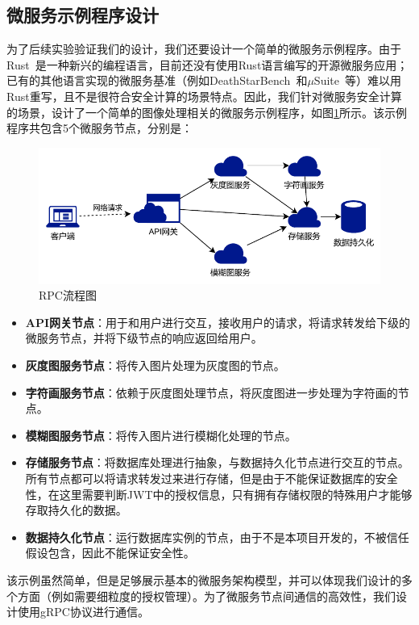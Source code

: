 \subsection{微服务示例程序设计}\label{subsec:ms-example}

为了后续实验验证我们的设计，我们还要设计一个简单的微服务示例程序。由于Rust~\cite{rust-lang}是一种新兴的编程语言，目前还没有使用Rust语言编写的开源微服务应用；已有的其他语言实现的微服务基准（例如DeathStarBench~\cite{gan2019open}和$\mu$Suite~\cite{sriraman2018mu}等）难以用Rust重写，且不是很符合安全计算的场景特点。因此，我们针对微服务安全计算的场景，设计了一个简单的图像处理相关的微服务示例程序，如图\ref{fig:ms-demo}所示。该示例程序共包含5个微服务节点，分别是：

\begin{figure}[!ht]
    \centering
    \includegraphics[width=.6\textwidth]{figures/msdemo.pdf}
    \caption{RPC流程图}
    \label{fig:ms-demo}
\end{figure}

\begin{itemize}
    \item \textbf{API网关节点}：用于和用户进行交互，接收用户的请求，将请求转发给下级的微服务节点，并将下级节点的响应返回给用户。
    \item \textbf{灰度图服务节点}：将传入图片处理为灰度图的节点。
    \item \textbf{字符画服务节点}：依赖于灰度图处理节点，将灰度图进一步处理为字符画的节点。
    \item \textbf{模糊图服务节点}：将传入图片进行模糊化处理的节点。
    \item \textbf{存储服务节点}：将数据库处理进行抽象，与数据持久化节点进行交互的节点。所有节点都可以将请求转发过来进行存储，但是由于不能保证数据库的安全性，在这里需要判断JWT中的授权信息，只有拥有存储权限的特殊用户才能够存取持久化的数据。
    \item \textbf{数据持久化节点}：运行数据库实例的节点，由于不是本项目开发的，不被信任假设包含，因此不能保证安全性。
\end{itemize}

该示例虽然简单，但是足够展示基本的微服务架构模型，并可以体现我们设计的多个方面（例如需要细粒度的授权管理）。为了微服务节点间通信的高效性，我们设计使用gRPC协议进行通信。
